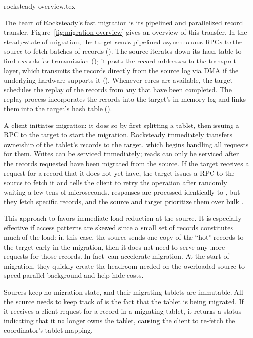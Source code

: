  {rocksteady-overview.tex}

The heart of Rocksteady's fast migration is its pipelined and
parallelized record transfer. Figure~\ref{fig:migration-overview} gives an
overview of this transfer.  In the steady-state of migration, the target
sends pipelined asynchronous \pull RPCs to the source to
fetch batches of records (\one). The source iterates down its hash table to
find records for transmission (\two); it posts the
record addresses to the transport layer, which transmits the records directly from the source log
via DMA if the underlying hardware supports it (\three). Whenever cores are available, the target schedules the
    replay of the records from any \pulls that have been completed. The replay process
incorporates the records into the target's in-memory log and links them
into the target's hash table (\four).

A client initiates migration: it does so by first splitting a tablet,
then issuing a \mt
RPC to the target to start the migration.
Rocksteady immediately transfers ownership of the tablet's records to the target,
which begins handling all requests for them.
Writes can be serviced immediately; reads can only be serviced after
the records requested have been migrated from the source.  If the target
receives a request for a record that it does not yet have, the 
target issues a \priopull RPC to the
source to fetch it and tells the client to retry the operation after randomly waiting a
few tens of microseconds. \priopull{} responses are processed identically to
\pulls, but they fetch specific records, and the source and target prioritize
them over bulk \pulls.

This approach to \priopulls favors immediate load
reduction at the source. It is especially effective if access patterns are
skewed since a small set of records constitutes much of the load: in this
case, the source sends one copy of the ``hot'' records to the target early
in the migration, then it does not need to serve any more requests for those
records.  In fact, \priopulls can
accelerate migration. At the start of migration, they quickly create the
headroom needed on the overloaded source to speed parallel background \pulls
and help hide \pull costs.

Sources
keep no migration state, and their migrating tablets are immutable. All the
source needs to keep track of is the fact that the tablet is being
migrated.
If
it receives a client request for a record in a migrating tablet,
it returns a status indicating that it no longer owns the tablet, causing the
client to re-fetch the coordinator's tablet mapping.

